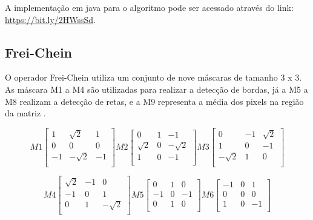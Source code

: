 \documentclass[
	12pt,				%
	oneside,			%
	a4paper,			%
	english,			%
	french,				%
	spanish,			%
	brazil,				%
	]{abntex2}
\begin{document}
A implementação em java para o algoritmo pode ser acessado através do link: \url{https://bit.ly/2HWssSd}.

\subsection{Frei-Chein}
O operador Frei-Chein utiliza um conjunto de nove máscaras de tamanho 3 x 3. As máscara M1 a M4 são utilizadas para realizar a detecção de bordas, já a M5 a M8 realizam a detecção de retas, e a M9 representa a média dos pixels na região da matriz \cite{pedriniSchwartz:2008}. 

\[
M1
\begin{bmatrix}
     	 	 	 1 &  \sqrt{2} &  1         \\ 
	             0 &         0 &  0         \\ 
	            -1 & -\sqrt{2} & -1         \\ 
\end{bmatrix} 
M2
\begin{bmatrix}
     	     0 &             1 & -1         \\ 
	  \sqrt{2} &             0 & -\sqrt{2}  \\ 
	         1 &             0 & -1         \\ 
\end{bmatrix}
M3
\begin{bmatrix}
     	 	 0 &            -1 & \sqrt{2}   \\ 
	         1 &             0 & -1         \\ 
	 -\sqrt{2} &             1 &  0         \\ 
\end{bmatrix} 
\]

\[
M4
\begin{bmatrix}
      \sqrt{2} &            -1 &  0         \\
	        -1 &             0 & 1          \\
	         0 &             1 & -\sqrt{2}  \\
\end{bmatrix} 
M5
\begin{bmatrix}
    	 	 0 &             1 &  0          \\ 
	        -1 &             0 & -1          \\ 
	         0 &             1 &  0          \\ 
\end{bmatrix}
M6
\begin{bmatrix}
  	 	 	-1 &             0 &  1          \\ 
             0 &             0 &  0          \\ 
             1 &             0 & -1          \\ 
\end{bmatrix} 
\]
\end{document}
